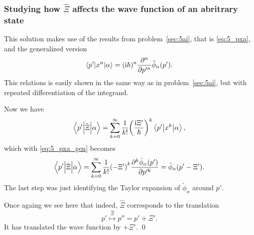 \documentclass[11pt,letter, swedish, english
]{article}
\begin{document}
\subsubsection{Studying how $\hat\Xi$ affects the wave function of an
  abritrary state}
This solution makes use of the results from problem~\ref{sec:5ai},
that is \eqref{eq:5_pxa}, and the generalized version
\begin{equation}\label{eq:5_pxa_gen}
\mel**{p'}{x^n}{\alpha} 
= (\mathrm{i}\hbar)^n \frac{\partial^n}{\partial p'^n} \hat{\phi}_\alpha(p').
\end{equation}
This relations is easily shown in the same way as in
problem~\ref{sec:5ai}, but with repeated differentiation of the
integrand. 

Now we have
\begin{equation}
\mel**{p'}{\hat\Xi}{\alpha} 
= \sum_{k=0}^\infty \frac{1}{k!} \qty(\frac{\mathrm{i}\Xi'}{\hbar})^k\mel**{p'}{x^k}{\alpha},
\end{equation}
which with \eqref{eq:5_pxa_gen} becomes
\begin{equation}
\mel**{p'}{\hat\Xi}{\alpha} 
= \sum_{k=0}^\infty \frac{1}{k!} \qty(-\Xi')^k
       \frac{\partial^k \tilde\phi_\alpha(p')}{\partial p'^k}
= \tilde\phi_\alpha\qty(p'-\Xi').
\end{equation}
The last step was just identifying the Taylor expansion of
$\tilde\phi_\alpha$ around $p'$. 

Once againg we see here that indeed, $\hat\Xi$ corresponds to the translation
\begin{equation}
p'\stackrel{\hat\Xi}{\longmapsto} p'' = p' +\Xi'.
\end{equation}
It has translated the wave function by $+\Xi'$.
\qed
\end{document}
